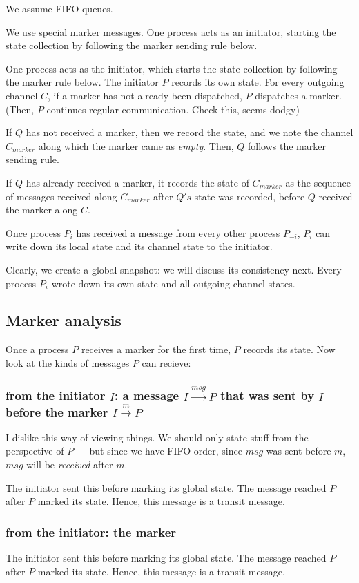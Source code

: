 \documentclass[11pt]{book}
\begin{document}
We assume FIFO queues.

We use special marker messages. One process acts as an initiator, starting
the state collection by following the marker sending rule below.

One process acts as the initiator, which starts the state collection by 
following the marker rule below. The initiator $P$ records its own state.
For every outgoing channel $C$, if a marker has not already been dispatched,
$P$ dispatches a marker. (Then, $P$ continues regular communication. Check this, seems dodgy)

If $Q$ has not received a marker, then we record the state, and we note
the channel $C_{marker}$ along which the marker came as \emph{empty}. Then,
$Q$ follows the marker sending rule.

If $Q$ has already received a marker, it records the state of $C_{marker}$ as
the sequence of messages received along $C_{marker}$ after $Q's$ state was
recorded, before $Q$ received the marker along $C$.

Once process $P_i$ has received a message from every other process $P_{-i}$,
$P_i$ can write down its local state and its channel state to the initiator.

Clearly, we create a global snapshot: we will discuss its consistency next.
Every process $P_i$ wrote down its own state and all outgoing channel states.

\subsection{Marker analysis}

Once a process $P$ receives a marker for the first time, $P$ records its
state. Now look at the kinds of messages $P$ can recieve:

\subsubsection{from the initiator $I$: a message $I \xrightarrow{msg} P$ that was sent by $I$ before the marker $I \xrightarrow{m} P$}
I dislike this way of viewing things. We should only state stuff from
the perspective of $P$ --- but since we have FIFO order, since $msg$ was
sent before $m$, $msg$ will be \emph{received} after $m$.

The initiator sent this before marking its global state. The message reached
$P$ after $P$ marked its state. Hence, this message is a transit message.


\subsubsection{from the initiator: the marker}
The initiator sent this before marking its global state. The message reached
$P$ after $P$ marked its state. Hence, this message is a transit message.
\end{document}
